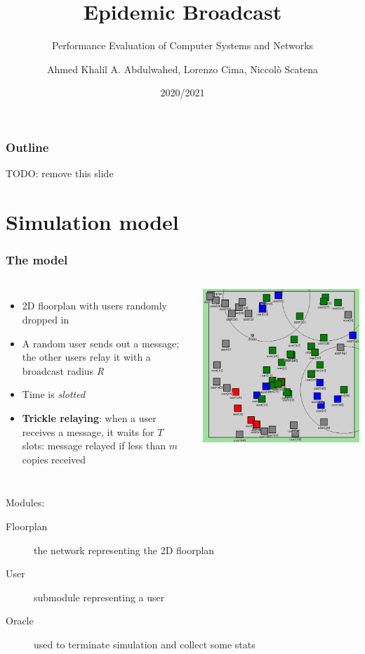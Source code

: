 \documentclass{beamer}
\title{Epidemic Broadcast}
\subtitle{Performance Evaluation of Computer Systems and Networks}
\author[Abdulwahed, Cima, Scatena]{Ahmed Khalil A. Abdulwahed, Lorenzo Cima, Niccolò Scatena}
\institute[UNIPI]{University of Pisa}
\date{2020/2021}
\begin{document}
\begin{frame}
	\titlepage{}
\end{frame}

\begin{frame}
	\frametitle{Outline}
	\tableofcontents
	TODO\@: remove this slide
\end{frame}

\section{Simulation model}

\begin{frame}
	\frametitle{The model}
	\begin{columns}
		\begin{itemize}
			\item 2D floorplan with users randomly dropped in
			\item A random user sends out a message; the other users
				relay it with a broadcast radius \emph{R}
			\item Time is \emph{slotted}
			\item \textbf{Trickle relaying}: when a user receives a
				message, it waits for \(T\) slots: message
				relayed if less than \(m\) copies received
		\end{itemize}
		\includegraphics[width=\textwidth]{img/snapshot}
	\end{columns}
	Modules:
	\begin{description}
		\item[Floorplan] the network representing the 2D
			floorplan
		\item[User] submodule representing a user
		\item[Oracle] used to terminate simulation and collect
			some stats
	\end{description}
\end{frame}
\end{document}
